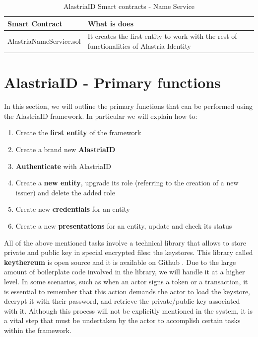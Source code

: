 \documentclass[target=mst,aauheader=]{thud}
\begin{document}
\begin{table}[h!]
    \begin{tabular}{|p{6cm}|p{12cm}|}
    \hline
    Smart Contract & What is does\\ [0.5ex] 
    \hline\hline
    AlastriaNameService.sol	 & It creates the first entity to work with the rest of functionalities of Alastria Identity \\ 
    \hline
    \end{tabular}
    \caption{AlastriaID Smart contracts - Name Service}
    \label{table:nameService}


\end{table}

\section{AlastriaID - Primary functions}

In this section, we will outline the primary functions that can be performed using the AlastriaID framework.
In particular we will explain how to:

\begin{enumerate}

    \item Create the \textbf{first entity} of the framework
    \item Create a brand new \textbf{AlastriaID}
    \item \textbf{Authenticate} with AlastriaID
    \item Create a \textbf{new entity}, upgrade its role (referring to the creation of a new issuer) and delete the added role
    \item Create new \textbf{credentials} for an entity
    \item Create a new \textbf{presentations} for an entity, update and check its status

\end{enumerate}

All of the above mentioned tasks involve a technical library that allows to store private and public key in special encrypted files: the keystores. This library called \textbf{keythereum} is open source and it is available on Github \cite{keythereum}. Due to the large amount of boilerplate code involved in the library, we will handle it at a higher level. In some scenarios, such as when an actor signs a token or a transaction, it is essential to remember that this action demands the actor to load the keystore, decrypt it with their password, and retrieve the private/public key associated with it. Although this process will not be explicitly mentioned in the system, it is a vital step that must be undertaken by the actor to accomplish certain tasks within the framework.
\end{document}
